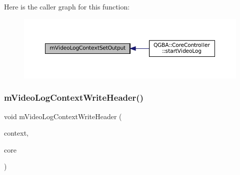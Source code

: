 Here is the caller graph for this function\+:
\nopagebreak
\begin{figure}[H]
\begin{center}
\leavevmode
\includegraphics[width=350pt]{video-logger_8c_a89d33ff62ba22b7fcd0fe5e895b4c95e_icgraph}
\end{center}
\end{figure}
\mbox{\label{video-logger_8c_a53b5285dc89f4789592daef5ba376368}} 
\subsubsection{\texorpdfstring{m\+Video\+Log\+Context\+Write\+Header()}{mVideoLogContextWriteHeader()}}
{\footnotesize\ttfamily void m\+Video\+Log\+Context\+Write\+Header (\begin{DoxyParamCaption}\item[{struct m\+Video\+Log\+Context $\ast$}]{context,  }\item[{struct m\+Core $\ast$}]{core }\end{DoxyParamCaption})}

